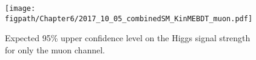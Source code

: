\begin{figure}[!hbt]
    \centering
    \texttt{[image: \\figpath/Chapter6/2017\_10\_05\_combinedSM\_KinMEBDT\_muon.pdf]}
    \caption{Expected 95\% upper confidence level on the Higgs signal strength for only the muon channel.}
    \label{fig:limits_withSys_muon}
\end{figure}

\begin{comment}
A distribution of the BDT discriminant is produced for every signal, background, and data sample and then passed to the RooStats-based Higgs Combine Tool~\cite{CombineToolTwiki} to compute limits on the Higgs signal strength.
Given that this analysis has a relatively high number of events in the expected yields we make use of the asymptotic method\footnote{If there had been a lower number of expected events we may have needed to use the full frequentist method rather than the asymptotic method.} for limit setting along with the CL\textsubscript{s} test statistic~\cite{Read:2002hq}.
Using an Asimov dataset an expected 95\% upper confidence level is obtained and shown in figure~\ref{fig:limits} (left).


original bin width 0.02 [-1,1]
bin must have background events
stat error must be less than 10\%
bins merged left to right until all bins meet this criteria
limited or no background in a bin would lead to an inflated signal significance if data, but no background


effect on the limit calculation if that uncertainty is removed from the calculation.


begin{figure}[!hbt]
	\centering
	\begin{subfigure}[t]{0.46\textwidth}
		\texttt{[image: \\figpath/Chapter4/2015\_08\_01\_combinedSM\_KinMEBDT\_StatsOnly.pdf]}
		\label{fig:limits_stats_only}
	\end{subfigure}
	\begin{subfigure}[t]{0.46\textwidth}
		\texttt{[image: \\figpath/Chapter4/2015\_08\_01\_combinedSM\_KinMEBDT.pdf]}
		\label{fig:limits_with_sys}
	\end{subfigure}
	\caption{Expected 95\% upper confidence level on the Higgs signal strength (left) without including systematic uncertainties and (right) with systematic uncertainties included. The median combined limit is found to be 2.01 without systematics and 3.48 with them.}
	\label{fig:limits}
\end{figure}
\end{comment}